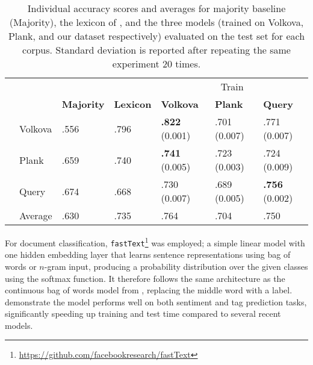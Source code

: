 \documentclass[11pt,letterpaper]{article}
\begin{document}
\begin{table*}
	\centering

	\begin{tabular}{llll|l|l|l|}

		\cline{5-7}
		& & & &  \multicolumn{3}{c|}{Train} \\
		\cline{3-7}


		                                      &                               & \multicolumn{1}{|l|}{\textbf{Majority}} &	\multicolumn{1}{|l|}{\textbf{Lexicon}}	& \textbf{Volkova}      & \textbf{Plank} & \textbf{Query}        \\


		\cline{2-7}
		                                      & \multicolumn{1}{|l|}{Volkova} & .556                                    &	\multicolumn{1}{|l|}{.796}             & \textbf{.822} (0.001) & .701 (0.007)    & .771  (0.007)         \\
		\multirow{1}{*}{\rotatebox{90}{Test}} & \multicolumn{1}{|l|}{Plank}   & .659                                    &	\multicolumn{1}{|l|}{.740}             & \textbf{.741} (0.005)          & .723 (0.003)    & .724  (0.009)         \\
		                                      & \multicolumn{1}{|l|}{Query}   & .674                                    &	\multicolumn{1}{|l|}{.668}             & .730  (0.007)         & .689 (0.005)    & \textbf{.756} (0.002) \\
		\cline{2-7}
		                                      & \multicolumn{1}{|l|}{Average} & .630                                    &	\multicolumn{1}{|l|}{.735}             & .764                  & .704            & .750                  \\
		\cline{2-7}
	\end{tabular}
	\caption{Individual accuracy scores and averages for majority baseline (Majority), the lexicon of
	  , and the three models
		(trained on Volkova, Plank, and our dataset respectively) evaluated
		on the test set for each corpus. Standard deviation is reported after repeating the
		same experiment 20 times.}
	\label{tab:res}
\end{table*}

For document classification, {\tt fastText}\footnote{\url{https://github.com/facebookresearch/fastText}} \cite{joulin2016bag}
was employed; a simple linear model with one hidden embedding layer that
learns sentence representations using bag of words or $n$-gram input, producing
a probability distribution over the given classes using the softmax function.
It therefore follows the same architecture as the continuous bag of words
model from , replacing the middle word with a label.
 demonstrate the model performs well on both sentiment and
tag prediction tasks, significantly speeding up training and test time
compared to several recent models.
\end{document}
